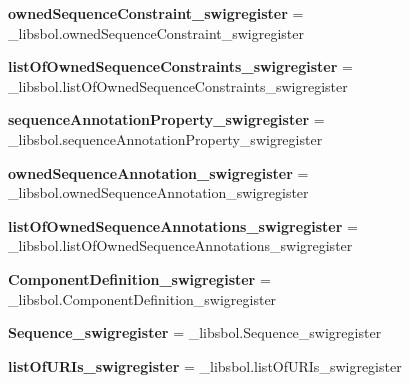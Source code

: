 \begin{DoxyCompactItemize}
\item 
{\bfseries owned\+Sequence\+Constraint\+\_\+swigregister} = \+\_\+libsbol.\+owned\+Sequence\+Constraint\+\_\+swigregister\hypertarget{namespacesbol_1_1libsbol_a294aa0414e2fdd78a6cf2077af010bfd}{}\label{namespacesbol_1_1libsbol_a294aa0414e2fdd78a6cf2077af010bfd}

\item 
{\bfseries list\+Of\+Owned\+Sequence\+Constraints\+\_\+swigregister} = \+\_\+libsbol.\+list\+Of\+Owned\+Sequence\+Constraints\+\_\+swigregister\hypertarget{namespacesbol_1_1libsbol_ad4082586d2c28bcd3eb9bf231569747d}{}\label{namespacesbol_1_1libsbol_ad4082586d2c28bcd3eb9bf231569747d}

\item 
{\bfseries sequence\+Annotation\+Property\+\_\+swigregister} = \+\_\+libsbol.\+sequence\+Annotation\+Property\+\_\+swigregister\hypertarget{namespacesbol_1_1libsbol_a1a6dd113910dc44e5fdaf413be2931cb}{}\label{namespacesbol_1_1libsbol_a1a6dd113910dc44e5fdaf413be2931cb}

\item 
{\bfseries owned\+Sequence\+Annotation\+\_\+swigregister} = \+\_\+libsbol.\+owned\+Sequence\+Annotation\+\_\+swigregister\hypertarget{namespacesbol_1_1libsbol_a234ed8cd5aaf254929248696092d5a94}{}\label{namespacesbol_1_1libsbol_a234ed8cd5aaf254929248696092d5a94}

\item 
{\bfseries list\+Of\+Owned\+Sequence\+Annotations\+\_\+swigregister} = \+\_\+libsbol.\+list\+Of\+Owned\+Sequence\+Annotations\+\_\+swigregister\hypertarget{namespacesbol_1_1libsbol_afbe01bc135f182cf83ab539fb43e5fcf}{}\label{namespacesbol_1_1libsbol_afbe01bc135f182cf83ab539fb43e5fcf}

\item 
{\bfseries Component\+Definition\+\_\+swigregister} = \+\_\+libsbol.\+Component\+Definition\+\_\+swigregister\hypertarget{namespacesbol_1_1libsbol_a1e881c9eaa7fa920aeeb1314f9a8a970}{}\label{namespacesbol_1_1libsbol_a1e881c9eaa7fa920aeeb1314f9a8a970}

\item 
{\bfseries Sequence\+\_\+swigregister} = \+\_\+libsbol.\+Sequence\+\_\+swigregister\hypertarget{namespacesbol_1_1libsbol_ac29b398fcc81c85dceba3b6017ed5168}{}\label{namespacesbol_1_1libsbol_ac29b398fcc81c85dceba3b6017ed5168}

\item 
{\bfseries list\+Of\+U\+R\+Is\+\_\+swigregister} = \+\_\+libsbol.\+list\+Of\+U\+R\+Is\+\_\+swigregister\hypertarget{namespacesbol_1_1libsbol_aa0c4ac3ff94e63a47a495c8aea06c611}{}\label{namespacesbol_1_1libsbol_aa0c4ac3ff94e63a47a495c8aea06c611}


\end{DoxyCompactItemize}
